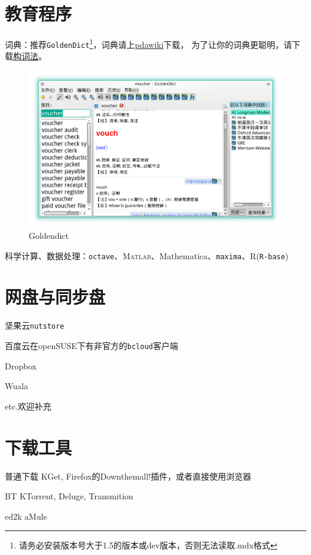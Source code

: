 \documentclass[11pt,openany]{book}
\newcommand{\soft}[1]{\texttt{\textcolor{dgreen}{#1}}}
\begin{document}
\section{教育程序}
词典：推荐\soft{GoldenDict}\footnote{请务必安装版本号大于1.5的版本或dev版本，否则无法读取.mdx格式}，词典请上\href{http://pdawiki.com/forum/forum.php}{pdawiki}下载，
为了让你的词典更聪明，请下载\href{https://zpj.blog.ustc.edu.cn/wp-content/uploads/2014/02/wordsrule.tar.gz}{构词法}。
\begin{figure}[htbp]
\centering
\includegraphics[width=\textwidth]{./pic/goldendict.png} 
\caption{Goldendict}\label{goldendict}
\end{figure}
科学计算、数据处理：\soft{octave}、\textsc{Matlab}、Mathematica、\soft{maxima}、R(\soft{R-base})
\section{网盘与同步盘}
\begin{compactitem}
 \item 坚果云\soft{nutstore}
 \item 百度云在openSUSE下有非官方的\soft{bcloud}客户端
 \item Dropbox
 \item Wuala
 \item etc.欢迎补充
\end{compactitem}

\section{下载工具}
\begin{compactdesc}
 \item[普通下载] KGet, Firefox的Down\-them\-all!插件，或者直接使用浏览器
 \item[BT] KTorrent, Deluge, Transmition
 \item[ed2k] aMule
\end{compactdesc}
\end{document}
